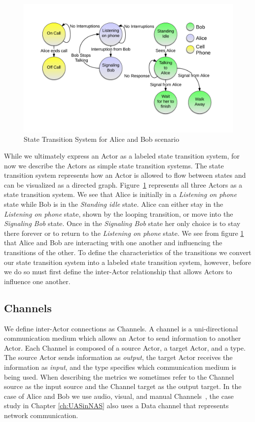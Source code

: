 \begin{figure}[h]
\begin{center}
\includegraphics[width=\textwidth]{ab_dirg.png}
\caption{State Transition System for Alice and Bob scenario}
\label{fig:ab_dirg}
\end{center}
\end{figure}

While we ultimately express an Actor as a labeled state transition system, for now we describe the Actors as simple state transition systems.  The state transition system represents how an Actor is allowed to flow between states and can be visualized as a directed graph.  Figure~\ref{fig:ab_dirg} represents all three Actors as a state transition system.  We see that Alice is initially in a {\em Listening on phone} state while Bob is in the {\em Standing idle} state.  Alice can either stay in the {\em Listening on phone} state, shown by the looping transition, or move into the {\em Signaling Bob} state.  Once in the {\em Signaling Bob} state her only choice is to stay there forever or to return to the {\em Listening on phone} state.  We see from figure \ref{fig:ab_dirg} that Alice and Bob are interacting with one another and influencing the transitions of the other.  To define the characteristics of the transitions we convert our state transition system into a labeled state transition system, however, before we do so must first define the inter-Actor relationship that allows Actors to influence one another.


\subsection{Channels}
We define inter-Actor connections as Channels.  A channel is a uni-directional communication medium which allows an Actor to send information to another Actor.  Each Channel is composed of a source Actor, a target Actor, and a type.  The source Actor sends information as {\em output}, the target Actor receives the information as {\em input}, and the type specifies which communication medium is being used.  When describing the metrics we sometimes refer to the Channel source as the input source and the Channel target as the output target.  In the case of Alice and Bob we use audio, visual, and manual Channels~\cite{wickens2002multiple}, the case study in Chapter \ref{ch:UASinNAS} also uses a Data channel that represents network communication.  

